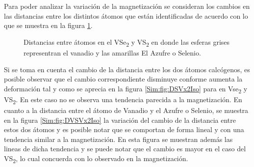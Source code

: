 Para poder analizar  la variaci\'on de la magnetizaci\'on se consideran los cambios en las distancias entre los distintos \'atomos que est\'an identificadas de acuerdo con lo que se muestra en la figura \ref{Sim:fig:disVX2Iso}. 
 \begin{figure}[!hbt]
 	\centering
 	\caption[ Distancias entre \'atomos   VSe\textsubscript{2} y VS\textsubscript{2} utilizados para el estudio de una deformaci\'on isotr\'opica]{Distancias entre \'atomos en el VSe\textsubscript{2} y  VS\textsubscript{2} en donde las esferas grises representran el vanadio y las amarillas El Azufre o Selenio.}
 	\label{Sim:fig:disVX2Iso}
 \end{figure}
\par Si se toma en cuenta el cambio de la distancia entre los dos \'atomos calc\'ogenos, es posible observar que el cambio correspondiente disminuye conforme aumenta la deformación tal y como se aprecia en la figura \ref{Sim:fig:DSVx2Iso} para en Vse\textsubscript{2} y VS\textsubscript{2}. En este caso no se observa  una tendencia parecida a la magnetizaci\'on. En cuanto a la distancia entre el \'atomo de Vanadio y el Azufre  o Selenio, se muestra en la figura \ref{Sim:fig:DVSVx2Iso} la  variaci\'on del cambio de la distancia entre estos dos \'atomos y es posible notar que se comportan de forma lineal y con una tendencia similar a la magnetizaci\'on. En esta figura se muestran adem\'as las lineas de dicha  tendencia y se puede notar que el cambio es mayor en el caso del VS\textsubscript{2}, lo cual  concuerda con lo observado en la magnetización. 

